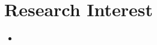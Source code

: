 \documentclass[letterpaper,10.8pt]{article}
\begin{document}
\head{}

\section{Research Interest}
\begin{itemize}
      \item {}
\end{itemize}







\end{document}
